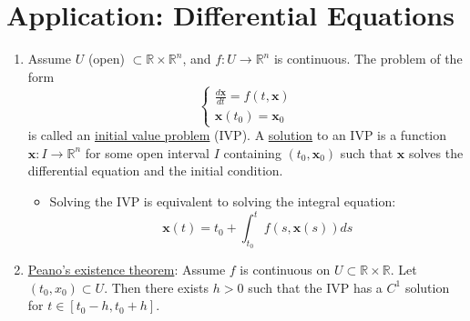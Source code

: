 \documentclass[%
 aip,
 jmp,%
 amsmath,amssymb,
 reprint,%
]{revtex4-1}
\def\R{{\mathbb R}}
\newcommand{\defn}[1]{\underline{#1}}
\begin{document}
\section{Application: Differential Equations}
\begin{enumerate}
    \item Assume $U$ (open) $\subset \R\times\R^n$, and $f: U\to\R^n$ is continuous.
    The problem of the form
    $$ \begin{cases}
        \frac{d\bm x}{dt} = f(t, \bm x) \\
        \bm x(t_0) = \bm x_0
    \end{cases}
    $$
    is called an \defn{initial value problem} (IVP).
    A \defn{solution} to an IVP is a function $\bm x: I \to \R^n$ for some open
    interval $I$ containing $(t_0, \bm x_0)$ such that $\bm x$ solves the
    differential equation and the initial condition.
        \begin{itemize}
            \item Solving the IVP is equivalent to solving the integral equation:
                  $$\bm x(t) = t_0 + \int_{t_0}^{t} f(s,\bm x(s))ds $$
        \end{itemize}

    \item \defn{Peano's existence theorem}: Assume $f$ is continuous on
    $U\subset \R\times\R$. Let $(t_0, x_0)\subset U$.
    Then there exists $h>0$ such that the IVP has a $C^1$ solution for
    $t \in [t_0 - h, t_0 + h]$.


\end{enumerate}
\end{document}

